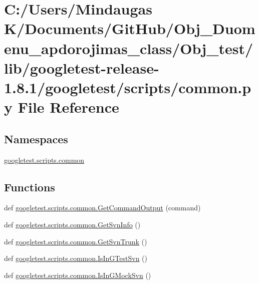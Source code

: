\hypertarget{_obj__test_2lib_2googletest-release-1_88_81_2googletest_2scripts_2common_8py}{}\section{C\+:/\+Users/\+Mindaugas K/\+Documents/\+Git\+Hub/\+Obj\+\_\+\+Duomenu\+\_\+apdorojimas\+\_\+class/\+Obj\+\_\+test/lib/googletest-\/release-\/1.8.1/googletest/scripts/common.py File Reference}
\label{_obj__test_2lib_2googletest-release-1_88_81_2googletest_2scripts_2common_8py}
\subsection*{Namespaces}
\begin{DoxyCompactItemize}
\item 
 \mbox{\hyperlink{namespacegoogletest_1_1scripts_1_1common}{googletest.\+scripts.\+common}}
\end{DoxyCompactItemize}
\subsection*{Functions}
\begin{DoxyCompactItemize}
\item 
def \mbox{\hyperlink{namespacegoogletest_1_1scripts_1_1common_a35e6f62f3f4713b86e329724bf510833}{googletest.\+scripts.\+common.\+Get\+Command\+Output}} (command)
\item 
def \mbox{\hyperlink{namespacegoogletest_1_1scripts_1_1common_a5749e9f6b59977a3c38235877d6f46ec}{googletest.\+scripts.\+common.\+Get\+Svn\+Info}} ()
\item 
def \mbox{\hyperlink{namespacegoogletest_1_1scripts_1_1common_a8456e601f756b4a572d51add434d9f66}{googletest.\+scripts.\+common.\+Get\+Svn\+Trunk}} ()
\item 
def \mbox{\hyperlink{namespacegoogletest_1_1scripts_1_1common_a14b1316a139ba04a11410b4464f4461a}{googletest.\+scripts.\+common.\+Is\+In\+G\+Test\+Svn}} ()
\item 
def \mbox{\hyperlink{namespacegoogletest_1_1scripts_1_1common_a632fa0f65eb653d5feef5c7c597a5953}{googletest.\+scripts.\+common.\+Is\+In\+G\+Mock\+Svn}} ()
\end{DoxyCompactItemize}

